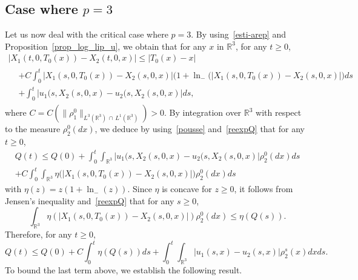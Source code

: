 \documentclass[10pt]{amsart}
\theoremstyle{definition}\newtheorem{defi}[theo]{Definition}\newtheorem{rema}[theo]{Remark}\newtheorem{exam}[theo]{Example}\newtheorem{exem}[theo]{Example}\newtheorem{nota}[theo]{Notation}
\newcommand{\R}{\mathbb{R}}
\renewcommand{\leq}{\leqslant}
\renewcommand{\geq}{\geqslant}
\begin{document}
\subsection{Case where \texorpdfstring{$p= 3$}{p=3}} Let us now deal with the critical case where $p= 3$. By using~\eqref{esti-arep} and Proposition~\ref{prop_log_lip_u}, we obtain that for any $x$ in $\R^3$, for any $t\geq 0$,
\begin{multline*}
\big|X_1(t,0,T_0 (x))-X_2(t,0,x)\big| \leq |T_0 (x)-x|
\\
\begin{aligned}
&+ C \int_0^t \big|X_1(s,0,T_0 (x)) - X_2(s,0,x) \big|\big(1+\ln_{-}(|X_1(s,0,T_0 (x)) - X_2(s,0,x) |\big) ds\\
&+
\int_0^t \big|u_1(s,X_2(s,0,x) - u_2(s,X_2(s,0,x) \big| ds,
\end{aligned}
\end{multline*}
where $C=C(\|\rho_1^0\|_{L^3 (\R^3)\, \cap\, L^1 (\R^3)})>0$. By integration over $\R^3$ with respect to the measure $\rho_2^0(dx)$, we deduce by using~\eqref{pousse} and~\eqref{reexpQ} that for any $t\geq 0$,
\begin{multline*}
Q(t) \leq Q(0) + \int_0^t \int_{ \R^3}\big|u_1(s,X_2(s,0,x) - u_2(s,X_2(s,0,x) \big|\rho_2^0(dx) ds
\\ + C \int_0^t\int_{\R^3} \eta\big(|X_1(s,0,T_0 (x)) - X_2(s,0,x) |\big) \rho_2^0(dx) ds
\end{multline*}
with $\eta(z)=z(1+\ln_{-}(z)) $. Since $\eta $ is concave for $z\geq 0$, it follows from Jensen's inequality and~\eqref{reexpQ} that for any $s\geq 0$,
\[
\int_{\R^3} \eta\left(|X_1(s,0,T_0 (x)) - X_2(s,0,x) |\right)\rho_2^0(dx) \leq \eta \left(Q(s) \right).
\]
Therefore, for any $t\geq 0$,
\begin{equation}\label{ineq-Q_p=3}
Q(t)
\leq Q(0)+ C \int_0^t \eta\left(Q(s)\right) ds+ \int_0^t \int_{\R^3}|u_1(s,x) - u_2(s,x) |\rho_2^s(x)dx ds.
\end{equation}
To bound the last term above, we establish the following result.
\end{document}
